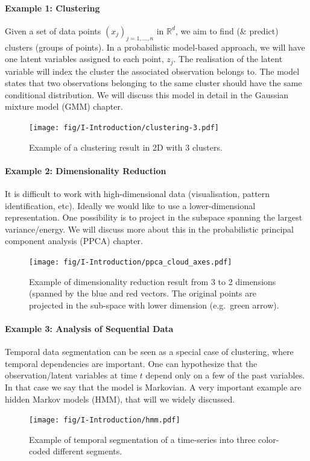 \paragraph{Example 1: Clustering} Given a set of data points $(x_j)_{j=1,\ldots,n}$ in ${\mathbb R}^d$, we aim to find (\& predict) clusters (groups of points). In a probabilistic model-based approach, we will have one latent variables assigned to each point, $z_j$. The realisation of the latent variable will index the cluster the associated observation belongs to. The model states that two observations belonging to the same cluster should have the same conditional distribution. We will discuss this model in detail in the Gaussian mixture model (GMM) chapter.
\begin{figure}[H]
\centering
\texttt{[image: fig/I-Introduction/clustering-3.pdf]}
\caption{Example of a clustering result in 2D with 3 clusters.}
\end{figure}


\paragraph{Example 2: Dimensionality Reduction} It is difficult to work with high-dimensional data (visualisation, pattern identification, etc). Ideally we would like to use a lower-dimensional representation. One possibility is to project in the subspace spanning the largest variance/energy. We will discuss more about this in the probabilistic principal component analysis (PPCA) chapter.
	
\begin{figure}[H]
\centering
\texttt{[image: fig/I-Introduction/ppca\_cloud\_axes.pdf]}
\caption{Example of dimensionality reduction result from 3 to 2 dimensions (spanned by the blue and red vectors. The original points are projected in the sub-space with lower dimension (e.g.\ green arrow).}
\end{figure}


\paragraph{Example 3: Analysis of Sequential Data} Temporal data segmentation can be seen as a special case of clustering, where temporal dependencies are important. One can hypothesize that the observation/latent variables at time $t$ depend only on a few of the past variables. In that case we say that the model is Markovian. A very important example are hidden Markov models (HMM), that will we widely discussed.
\begin{figure}[H]
\centering
\texttt{[image: fig/I-Introduction/hmm.pdf]}
\caption{Example of temporal segmentation of a time-series into three color-coded different segments.}
\end{figure}


